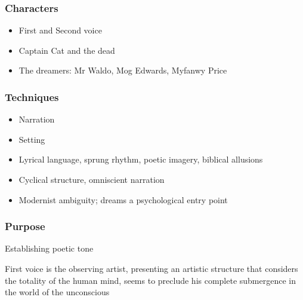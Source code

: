 		\subsubsection{Characters}

			\begin{itemize}
				\item First and Second voice
				\item Captain Cat and the dead
				\item The dreamers: Mr Waldo, Mog Edwards, Myfanwy Price
			\end{itemize}

		\subsubsection{Techniques}
		
			\begin{itemize}
				\item Narration
				\item Setting
				\item Lyrical language, sprung rhythm, poetic imagery, biblical allusions
				\item Cyclical structure, omniscient narration
				\item Modernist ambiguity; dreams a psychological entry point
			\end{itemize}

		\subsubsection{Purpose}
			
			Establishing poetic tone

			First voice is the observing artist, presenting an artistic structure that considers the totality of the human mind, seems to preclude his complete submergence in the world of the unconscious

